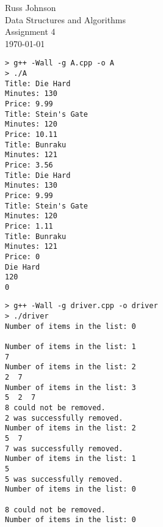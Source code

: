 \documentclass[11pt,a4paper]{article}
\begin{document}
\lstset{language=C++,
basicstyle=\small\ttfamily,
xleftmargin=-2cm,
tabsize=4,
showspaces=false,
showstringspaces=false}

\begin{flushright}
Russ Johnson\\
Data Structures and Algorithms\\
Assignment 4\\
\today\\
\end{flushright}


\begin{verbatim}
> g++ -Wall -g A.cpp -o A
> ./A
Title: Die Hard
Minutes: 130
Price: 9.99
Title: Stein's Gate
Minutes: 120
Price: 10.11
Title: Bunraku
Minutes: 121
Price: 3.56
Title: Die Hard
Minutes: 130
Price: 9.99
Title: Stein's Gate
Minutes: 120
Price: 1.11
Title: Bunraku
Minutes: 121
Price: 0
Die Hard
120
0

\end{verbatim}
\newpage

\newpage

\newpage

\newpage
\begin{verbatim}
> g++ -Wall -g driver.cpp -o driver
> ./driver
Number of items in the list: 0

Number of items in the list: 1
7  
Number of items in the list: 2
2  7  
Number of items in the list: 3
5  2  7  
8 could not be removed.
2 was successfully removed.
Number of items in the list: 2
5  7  
7 was successfully removed.
Number of items in the list: 1
5  
5 was successfully removed.
Number of items in the list: 0

8 could not be removed.
Number of items in the list: 0

\end{verbatim}
\newpage


\newpage

\newpage

\newpage

\end{document}
